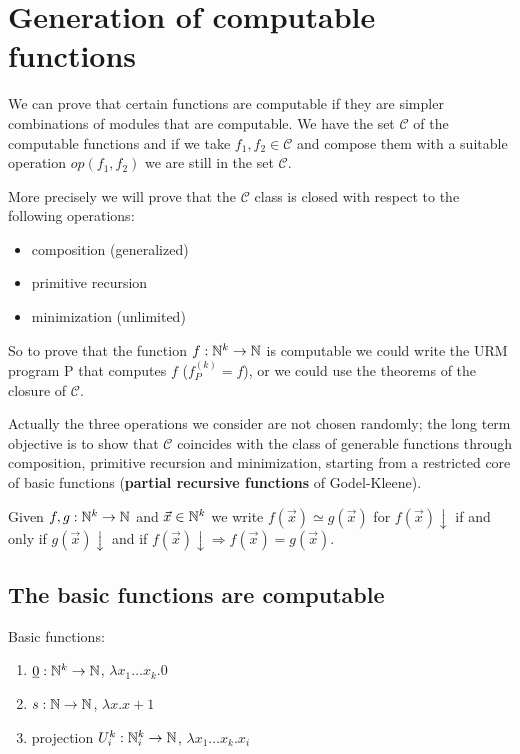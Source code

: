 \chapter {Generation of computable functions}

We can prove that certain functions are computable if they are simpler combinations of modules that are computable. We have the set $ \mathcal{C} $ of the computable functions and if we take $ f_1, f_2 \in \mathcal{C} $ and compose them with a suitable operation $ op(f_1, f_2) $ we are still in the set $ \mathcal{C} $.

More precisely we will prove that the $\mathcal{C}$ class is closed with respect to the following operations:
\begin{itemize}
\item composition (generalized)
\item primitive recursion
\item minimization (unlimited)
\end{itemize}

So to prove that the function $f:\mathbb{N}^k\rightarrow \mathbb{N}$ is computable we could write the URM program P that computes $f$ ($f_P^{(k)} = f$), or we could use the theorems of the closure of $\mathcal{C}$.

Actually the three operations we consider are not chosen randomly; the long term objective is to show that $\mathcal{C}$ coincides with the class of generable functions through composition, primitive recursion and minimization, starting from a restricted core of basic functions (\textbf{partial recursive functions} of Godel-Kleene).

\begin{notation}
  Given $f,g:\mathbb{N}^k\rightarrow\mathbb{N}$ and
  $\vec{x}\in\mathbb{N}^k$ we write $f(\vec{x}) \simeq g(\vec{x}) $ for
  $f(\vec{x})\downarrow$ if and only if $g(\vec{x})\downarrow$ and if
  $f(\vec{x})\downarrow \Rightarrow f(\vec{x}) = g(\vec{x})$.
\end{notation}

\section {The basic functions are computable}
Basic functions:
\begin{enumerate}
\item $ \underline{0}: \mathbb{N}^k \rightarrow \mathbb{N} $, $\lambda x_1\dots x_k . 0$
\item $ s: \mathbb{N} \rightarrow \mathbb{N} $, $\lambda x . x+1$
\item projection $ U_i^k: \mathbb{N}_i^k \rightarrow \mathbb{N} $,  $\lambda x_1\dots x_k . x_i$
\end{enumerate}

